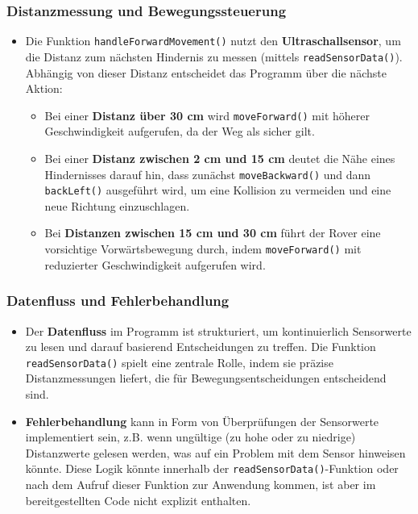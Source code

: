 \documentclass{vorlage-design-main}
\begin{document}
\hypertarget{distanzmessung-und-bewegungssteuerung}{%
\subsubsection{Distanzmessung und
Bewegungssteuerung}\label{distanzmessung-und-bewegungssteuerung}}

\begin{itemize}

\item
  Die Funktion \verb|handleForwardMovement()| nutzt
  den \textbf{Ultraschallsensor}, um die Distanz zum nächsten Hindernis
  zu messen (mittels \verb|readSensorData()|).
  Abhängig von dieser Distanz entscheidet das Programm über die nächste
  Aktion:

  \begin{itemize}
  
  \item
    Bei einer \textbf{Distanz über 30 cm} wird
    \verb|moveForward()| mit höherer Geschwindigkeit
    aufgerufen, da der Weg als sicher gilt.
  \item
    Bei einer \textbf{Distanz zwischen 2 cm und 15 cm} deutet die Nähe
    eines Hindernisses darauf hin, dass zunächst
    \verb|moveBackward()| und dann
    \verb|backLeft()| ausgeführt wird, um eine
    Kollision zu vermeiden und eine neue Richtung einzuschlagen.
  \item
    Bei \textbf{Distanzen zwischen 15 cm und 30 cm} führt der Rover eine
    vorsichtige Vorwärtsbewegung durch, indem
    \verb|moveForward()| mit reduzierter
    Geschwindigkeit aufgerufen wird.
  \end{itemize}
\end{itemize}

\hypertarget{datenfluss-und-fehlerbehandlung}{%
\subsubsection{Datenfluss und
Fehlerbehandlung}\label{datenfluss-und-fehlerbehandlung}}

\begin{itemize}

\item
  Der \textbf{Datenfluss} im Programm ist strukturiert, um
  kontinuierlich Sensorwerte zu lesen und darauf basierend
  Entscheidungen zu treffen. Die Funktion
  \verb|readSensorData()| spielt eine zentrale Rolle,
  indem sie präzise Distanzmessungen liefert, die für
  Bewegungsentscheidungen entscheidend sind.
\item
  \textbf{Fehlerbehandlung} kann in Form von Überprüfungen der
  Sensorwerte implementiert sein, z.B. wenn ungültige (zu hohe oder zu
  niedrige) Distanzwerte gelesen werden, was auf ein Problem mit dem
  Sensor hinweisen könnte. Diese Logik könnte innerhalb der
  \verb|readSensorData()|-Funktion oder nach dem
  Aufruf dieser Funktion zur Anwendung kommen, ist aber im
  bereitgestellten Code nicht explizit enthalten.
\end{itemize}
\end{document}
